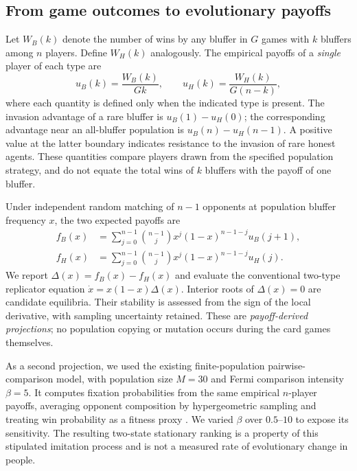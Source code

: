 \documentclass[11pt,a4paper]{article}
\begin{document}
\subsection{From game outcomes to evolutionary payoffs}
Let $W_B(k)$ denote the number of wins by any bluffer in $G$ games with $k$ bluffers among $n$ players. Define $W_H(k)$ analogously. The empirical payoffs of a \emph{single} player of each type are
\begin{equation}
 u_B(k)=\frac{W_B(k)}{Gk},\qquad u_H(k)=\frac{W_H(k)}{G(n-k)},
 \label{eq:payoffs}
\end{equation}
where each quantity is defined only when the indicated type is present. The invasion advantage of a rare bluffer is $u_B(1)-u_H(0)$; the corresponding advantage near an all-bluffer population is $u_B(n)-u_H(n-1)$. A positive value at the latter boundary indicates resistance to the invasion of rare honest agents. These quantities compare players drawn from the specified population strategy, and do not equate the total wins of $k$ bluffers with the payoff of one bluffer.

Under independent random matching of $n-1$ opponents at population bluffer frequency $x$, the two expected payoffs are
\begin{equation}
\begin{aligned}
 f_B(x)&=\sum_{j=0}^{n-1}\binom{n-1}{j}x^j(1-x)^{n-1-j}u_B(j+1),\\
 f_H(x)&=\sum_{j=0}^{n-1}\binom{n-1}{j}x^j(1-x)^{n-1-j}u_H(j).
\end{aligned}
\label{eq:fitness}
\end{equation}
We report $\Delta(x)=f_B(x)-f_H(x)$ and evaluate the conventional two-type replicator equation $\dot x=x(1-x)\Delta(x)$. Interior roots of $\Delta(x)=0$ are candidate equilibria. Their stability is assessed from the sign of the local derivative, with sampling uncertainty retained. These are \emph{payoff-derived projections}; no population copying or mutation occurs during the card games themselves.

As a second projection, we used the existing finite-population pairwise-comparison model, with population size $M=30$ and Fermi comparison intensity $\beta=5$. It computes fixation probabilities from the same empirical $n$-player payoffs, averaging opponent composition by hypergeometric sampling and treating win probability as a fitness proxy \citep{traulsen2007,omidshafiei2019}. We varied $\beta$ over $0.5$--$10$ to expose its sensitivity. The resulting two-state stationary ranking is a property of this stipulated imitation process and is not a measured rate of evolutionary change in people.
\end{document}
